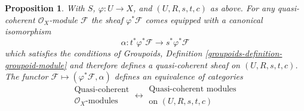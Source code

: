 \documentclass{stacks-project}
\theoremstyle{plain}
\newtheorem{proposition}[subsection]{Proposition}
\theoremstyle{definition}
\theoremstyle{remark}
\numberwithin{equation}{subsection}
\begin{document}
\begin{proposition}
\label{proposition-quasi-coherent}
With $S$, $\varphi : U \to X$, and $(U, R, s, t, c)$ as above.
For any quasi-coherent $\mathcal{O}_X$-module $\mathcal{F}$ the
sheaf $\varphi^*\mathcal{F}$ comes equipped with a canonical
isomorphism
$$
\alpha : t^*\varphi^*\mathcal{F} \longrightarrow s^*\varphi^*\mathcal{F}
$$
which satisfies the conditions of
Groupoids, Definition \ref{groupoids-definition-groupoid-module}
and therefore defines a quasi-coherent sheaf on $(U, R, s, t, c)$.
The functor $\mathcal{F} \mapsto (\varphi^*\mathcal{F}, \alpha)$
defines an equivalence of categories
$$
\begin{matrix}
\text{Quasi-coherent} \\
\mathcal{O}_X\text{-modules}
\end{matrix}
\longleftrightarrow
\begin{matrix}
\text{Quasi-coherent modules}\\
\text{on }(U, R, s, t, c)
\end{matrix}
$$
\end{proposition}
\end{document}
